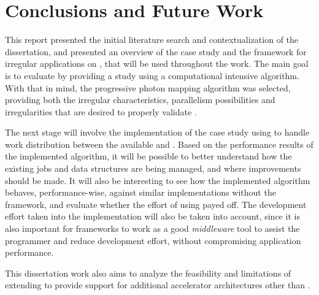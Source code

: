 \documentclass[main.tex]{subfiles}
\begin{document}
\section{Conclusions and Future Work} \label{section:conc}

This report presented the initial literature search and contextualization of the dissertation, and presented an overview of the case study and the \gama framework for irregular applications on \hetplats, that will be used throughout the work. The main goal is to evaluate \gama by providing a study using a computational intensive algorithm. With that in mind, the progressive photon mapping algorithm was selected, providing both the irregular characteristics, parallelism possibilities and irregularities that are desired to properly validate \gama.

The next stage will involve the implementation of the case study using \gama to handle work distribution between the available \cpus and \gpus. Based on the performance results of the implemented algorithm, it will be possible to better understand how the existing jobs and data structures are being managed, and where improvements should be made. It will also be interesting to see how the implemented algorithm behaves, performance-wise, against similar implementations without the framework, and evaluate whether the effort of using \gama payed off. The development effort taken into the implementation will also be taken into account, since it is also important for frameworks to work as a good \textit{middleware} tool to assist the programmer and reduce development effort, without compromising application performance.

This dissertation work also aims to analyze the feasibility and limitations of extending \gama to provide support for additional accelerator architectures other than \gpus.
\end{document}

